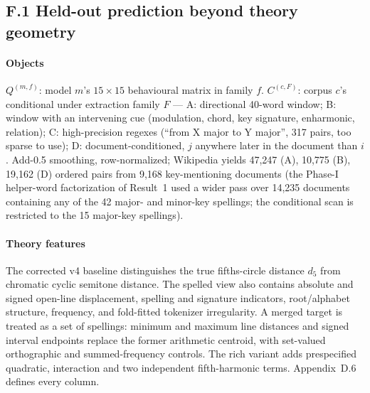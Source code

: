 \documentclass[11pt]{article}
\begin{document}
\subsection*{F.1 Held-out prediction beyond theory geometry}

\paragraph{Objects} $Q^{(m,f)}$: model $m$'s $15\times15$ behavioural matrix in family $f$. $C^{(c,F)}$: corpus $c$'s conditional under extraction family $F$ --- A: directional 40-word window; B: window with an intervening cue (modulation, chord, key signature, enharmonic, relation); C: high-precision regexes (``from X major to Y major'', 317 pairs, too sparse to use); D: document-conditioned, $j$ anywhere later in the document than $i$. Add-0.5 smoothing, row-normalized; Wikipedia yields 47,247 (A), 10,775 (B), 19,162 (D) ordered pairs from 9,168 key-mentioning documents (the Phase-I helper-word factorization of Result~1 used a wider pass over 14,235 documents containing any of the 42 major- and minor-key spellings; the conditional scan is restricted to the 15 major-key spellings).

\paragraph{Theory features} The corrected v4 baseline distinguishes the true fifths-circle distance $d_5$ from chromatic cyclic semitone distance. The spelled view also contains absolute and signed open-line displacement, spelling and signature indicators, root/alphabet structure, frequency, and fold-fitted tokenizer irregularity. A merged target is treated as a set of spellings: minimum and maximum line distances and signed interval endpoints replace the former arithmetic centroid, with set-valued orthographic and summed-frequency controls. The rich variant adds prespecified quadratic, interaction and two independent fifth-harmonic terms. Appendix~D.6 defines every column.
\end{document}
